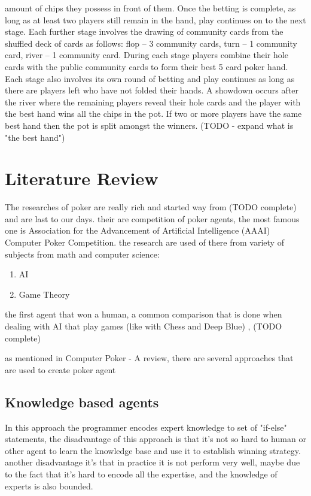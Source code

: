 \documentclass{article}
\begin{document}
amount of chips they possess in front of them. Once the betting is complete, as long as at least two players still remain
in the hand, play continues on to the next stage. Each further stage involves the drawing of community cards from the
shuffled deck of cards as follows: flop – 3 community cards, turn – 1 community card, river – 1 community card.
During each stage players combine their hole cards with the public community cards to form their best 5 card poker
hand. Each stage also involves its own round of betting and play continues as long as there are players left who have not
folded their hands. A showdown occurs after the river where the remaining players reveal their hole cards and the player
with the best hand wins all the chips in the pot. If two or more players have the same best hand then the pot is split
amongst the winners.
(TODO - expand what is "the best hand")
\section{Literature Review}
The researches of poker are really rich and started way from (TODO complete) and are last to our days.
their are competition of poker agents, the most famous one is Association for the Advancement of Artificial Intelligence (AAAI) Computer Poker Competition.
the research are used of there from variety of subjects from math and computer science:
\begin{enumerate}
\item AI
\item Game Theory
\end{enumerate}
the first agent that won a human, a common comparison that is done when dealing with AI that play games (like with Chess and Deep Blue) , (TODO complete)

as mentioned in Computer Poker - A review, there are several approaches that are used to create poker agent\\
\subsection{Knowledge based agents}
In this approach the programmer encodes expert knowledge to set of "if-else" statements, the disadvantage of this approach is that it's not so hard to human or other agent to learn the knowledge base and use it to establish winning strategy. another disadvantage it's that in practice it is not perform very well, maybe due to the fact that it's hard to encode all the expertise, and the knowledge of experts is also bounded.
\end{document}
